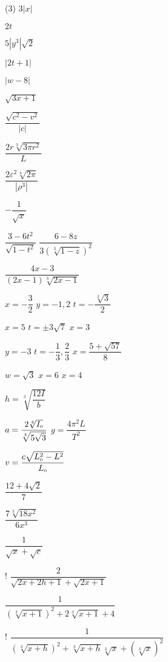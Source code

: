 \begin{tasks}(3)
\task   $3|x|$ 

\task   $2t$

\task   $5|y^3|\sqrt{2}$

\task  $|2t+1|$

\task  $|w-8|$

\task  $\sqrt{3x+1}$

\task $\dfrac{\sqrt{c^2-v^2}}{|c|}$ 

\task $\dfrac{2r \sqrt[3]{3 \pi r^2}}{L}$ 

\task  $\dfrac{2 \varepsilon^2 \sqrt[4]{2\pi}}{|\rho^3|}$ 


\task  $-\dfrac{1}{\sqrt{x}}$ 

\task  $\dfrac{3-6t^2}{\sqrt{1-t^2}}$
\task  $\dfrac{6-8z}{3 (\sqrt[3]{1-z})^2}$


\task  $\dfrac{4x-3}{(2x-1)\sqrt[3]{2x-1}}$  


\task  $x = -\dfrac{3}{2}$ 
\task $y = -1, 2$ 
\task  $t = -\dfrac{\sqrt[3]{3}}{2}$ 

\task $x = 5$
\task $t = \pm 3 \sqrt{7}$
\task $x=3$     


\task  $y=-3$ 
\task  $t = -\dfrac{1}{3}, \dfrac{2}{3}$ 
\task $x = \dfrac{5 + \sqrt{57}}{8}$

\task $w = \sqrt{3}$
\task $x = 6$
\task $x = 4$


\task $h = \sqrt[3]{\dfrac{12I}{b}}$ 

\task  $a = \dfrac{2 \sqrt[4]{I_{\text{\tiny $0$}}}}{\sqrt[4]{5\sqrt{3}}}$
\task $g = \dfrac{4 \pi^2 L}{T^2}$ 

\task $v = \dfrac{c \sqrt{L_{\text{\tiny $0$}}^2 - L^2}}{L_{\text{\tiny $0$}}}$  

\task   $\dfrac{12 + 4\sqrt{2}}{7}$  

\task  $\dfrac{7 \sqrt[3]{18x^2}}{6x^3}$

\task   $\dfrac{1}{\sqrt{x}+ \sqrt{c}}$ 

\task!  $\dfrac{2}{\sqrt{2x+2h+1} + \sqrt{2x+1}}$                                  

\task  $\dfrac{1}{(\sqrt[3]{x+1})^2 + 2\sqrt[3]{x+1} + 4}$                                    

\task!  $\dfrac{1}{(\sqrt[3]{x+h})^2 + \sqrt[3]{x+h}\sqrt[3]{x} + (\sqrt[3]{x})^2}$

\end{tasks}
